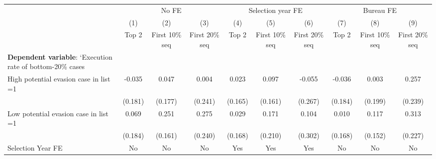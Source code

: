 {
\def\sym#1{\ifmmode^{#1}\else\(^{#1}\)\fi}
\begin{tabular}{l*{9}{c}}
\toprule
            &\multicolumn{3}{c}{No FE}                                        &\multicolumn{3}{c}{Selection year FE}                            &\multicolumn{3}{c}{Bureau FE}                                    \\\cmidrule(lr){2-4}\cmidrule(lr){5-7}\cmidrule(lr){8-10}
            &\multicolumn{1}{c}{(1)}&\multicolumn{1}{c}{(2)}&\multicolumn{1}{c}{(3)}&\multicolumn{1}{c}{(4)}&\multicolumn{1}{c}{(5)}&\multicolumn{1}{c}{(6)}&\multicolumn{1}{c}{(7)}&\multicolumn{1}{c}{(8)}&\multicolumn{1}{c}{(9)}\\
            &\multicolumn{1}{c}{Top 2}&\multicolumn{1}{c}{First 10\% seq}&\multicolumn{1}{c}{First 20\% seq}&\multicolumn{1}{c}{Top 2}&\multicolumn{1}{c}{First 10\% seq}&\multicolumn{1}{c}{First 20\% seq}&\multicolumn{1}{c}{Top 2}&\multicolumn{1}{c}{First 10\% seq}&\multicolumn{1}{c}{First 20\% seq}\\
\midrule
\textbf{Dependent variable}: `Execution rate of bottom-20\% cases&                     &                     &                     &                     &                     &                     &                     &                     &                     \\
\addlinespace
High potential evasion case in list =1&      -0.035         &       0.047         &       0.004         &       0.023         &       0.097         &      -0.055         &      -0.036         &       0.003         &       0.257         \\
            &     (0.181)         &     (0.177)         &     (0.241)         &     (0.165)         &     (0.161)         &     (0.267)         &     (0.184)         &     (0.199)         &     (0.239)         \\
\addlinespace
Low potential evasion case in list =1&       0.069         &       0.251         &       0.275         &       0.029         &       0.171         &       0.104         &       0.010         &       0.117         &       0.313         \\
            &     (0.184)         &     (0.161)         &     (0.240)         &     (0.168)         &     (0.210)         &     (0.302)         &     (0.168)         &     (0.152)         &     (0.227)         \\
\midrule
Selection Year FE&          No         &          No         &          No         &         Yes         &         Yes         &         Yes         &          No         &          No         &          No         \\

\end{tabular}}
